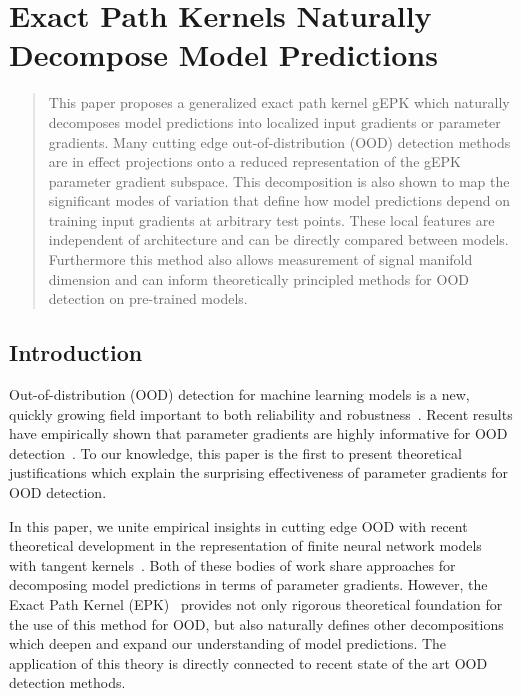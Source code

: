 \chapter{Exact Path Kernels Naturally Decompose Model Predictions}
\label{Chapter4a}

\begin{abstract}

This paper proposes a generalized exact path kernel gEPK which naturally decomposes model predictions into localized input gradients or parameter gradients. Many cutting edge out-of-distribution (OOD) detection methods are in effect projections onto a reduced representation of the gEPK parameter gradient subspace. This decomposition is also shown to map the significant modes of variation that define how model predictions depend on training input gradients at arbitrary test points. These local features are independent of architecture and can be directly compared between models. Furthermore this method also allows measurement of signal manifold dimension and can inform theoretically principled methods for OOD detection on pre-trained models. 




\end{abstract}

\section{Introduction}

Out-of-distribution (OOD) detection for machine learning models is a new, quickly growing field important to both reliability and robustness~\citep{hendrycks2019, biggio2014, hendrycks2017, desilva2023, yang2021, filos2020}.
Recent results have empirically shown that parameter gradients are highly informative for OOD detection~\citep{behpour2023, djurisic2023, huang2021}.
To our knowledge, this paper is the first to present theoretical justifications which explain the surprising effectiveness of parameter gradients for OOD detection.

In this paper, we unite empirical insights in cutting edge OOD with recent theoretical development in the representation of finite neural network models with tangent kernels~\citep{bell2023,chen2021equivalence,domingos2020}. 
Both of these bodies of work share approaches for decomposing model predictions in terms of parameter gradients. 
However, the Exact Path Kernel (EPK)~\citep{bell2023} provides not only rigorous theoretical foundation for the use of this method for OOD, but also naturally defines other decompositions which deepen and expand our understanding of model predictions. The application of this theory is directly connected to recent state of the art OOD detection methods.

